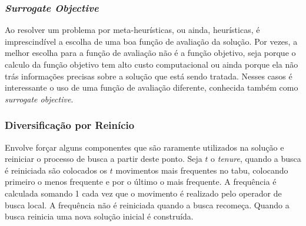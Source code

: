 \documentclass[conference]{IEEEtran}
\begin{document}
    \subsubsection{\it Surrogate Objective} 

        Ao resolver um problema por meta-heurísticas, ou ainda, heurísticas, é imprescindível a escolha de uma boa função de avaliação da solução. Por vezes, a melhor escolha para a função de
        avaliação não é a função objetivo, seja porque o calculo da função objetivo tem alto custo computacional ou ainda porque ela não trás informações precisas sobre a solução que está sendo
        tratada. Nesses casos é interessante o uso de uma função de avaliação diferente, conhecida também como {\it surrogate objective}.



    \subsubsection{Diversificação por Reinício}

        Envolve forçar alguns componentes que são raramente utilizados na solução e reiniciar o processo de busca a partir deste ponto.  Seja $t$ o \textit{tenure}, quando a busca é
        reiniciada são colocados os $t$ movimentos mais frequentes no tabu, colocando primeiro o menos frequente e por o último o mais frequente. A frequência é calculada somando 1 cada vez
        que o movimento é realizado pelo operador de busca local. A frequência não é reiniciada quando a busca recomeça. Quando a busca reinicia uma nova solução inicial é construída.

{}

\end{document}
